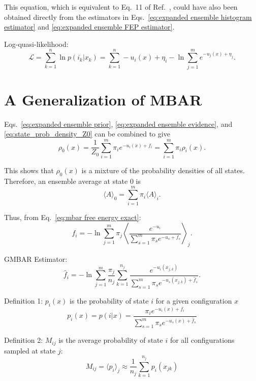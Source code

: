 \documentclass[aip,jcp,reprint,amsmath,amssymb]{revtex4-1}
\begin{document}
This equation, which is equivalent to Eq.~11 of Ref.~, could have also been obtained directly from the estimators in Eqs.~\eqref{eq:expanded ensemble histogram estimator} and \eqref{eq:expanded ensemble FEP estimator}. 

Log-quasi-likelihood:\cite{Doss_2014}
\begin{equation*}
\mathcal L = \sum_{k=1}^n \ln p(i_k|x_k) = \sum_{k=1}^n -u_i(x) + \eta_i - \ln \sum_{j=1}^m e^{-u_j(x) + \eta_j}.
\end{equation*}


\section{A Generalization of MBAR}

Eqs.~\eqref{eq:expanded ensemble prior}, \eqref{eq:expanded ensemble evidence}, and \eqref{eq:state_prob_density_Z0} can be combined to give
\begin{equation*}
\rho_0(x) = \frac{1}{Z_0} \sum_{i=1}^m \pi_i e^{-u_i(x) + f_i} = \sum_{i=1}^m \pi_i \rho_i(x).
\end{equation*}

This shows that $\rho_0(x)$ is a mixture of the probability densities of all states. Therefore, an ensemble average at state $0$ is
\begin{equation*}
\langle A \rangle_0 = \sum_{i=1}^m \pi_i \langle A \rangle_i.
\end{equation*}

Thus, from Eq.~\eqref{eq:mbar free energy exact}:
\begin{equation}
f_i = -\ln \sum_{j=1}^m \pi_j \left\langle \frac{e^{-u_i}}{\sum_{s=1}^m \pi_s e^{-u_s + f_s}} \right\rangle_j.
\end{equation}

GMBAR Estimator:
\begin{equation}
\hat f_i = -\ln \sum_{j=1}^m \frac{\pi_j}{n_j} \sum_{k=1}^{n_j} \frac{e^{-u_i(x_{j,k})}}{\sum_{s=1}^m \pi_s e^{-u_s(x_{j,k}) + \hat f_s}}.
\end{equation}


Definition 1: $p_i(x)$ is the probability of state $i$ for a given configuration $x$
\begin{equation}
p_i(x) = p(i|x) = \frac{\pi_i e^{-u_i(x) + f_i}}{\sum_{s=1}^m \pi_s e^{-u_s(x) + \hat f_s}}
\end{equation}

Definition 2: $M_{ij}$ is the average probability of state $i$ for all configurations sampled at state $j$:
\begin{equation*}
M_{ij} = \langle p_i \rangle_j \approx \frac{1}{n_j} \sum_{k=1}^{n_j} p_i(x_{jk})
\end{equation*}
\end{document}
